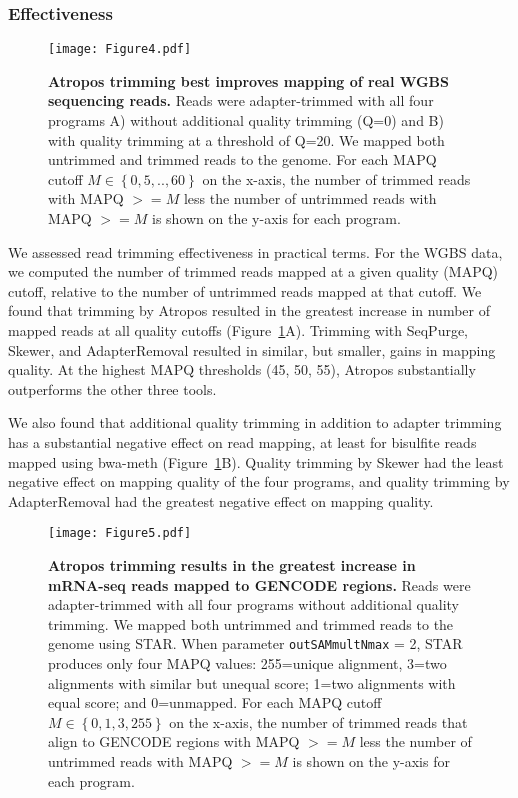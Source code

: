 \documentclass[fleqn,10pt,lineno]{wlpeerj} %
\begin{document}
\subsubsection{Effectiveness}

\begin{figure}[!ht]
\centering
\texttt{[image: Figure4.pdf]}
\caption{\textbf{Atropos trimming best improves mapping of real WGBS sequencing reads.} Reads were adapter-trimmed with all four programs A) without additional quality trimming (Q=0) and B) with quality trimming at a threshold of Q=20. We mapped both untrimmed and trimmed reads to the genome. For each MAPQ cutoff $M \in \left\{{0, 5, .., 60}\right\}$ on the x-axis, the number of trimmed reads with MAPQ $>= M$ less the number of untrimmed reads with MAPQ $>= M$ is shown on the y-axis for each program.}
\label{fig:wgbs-effectiveness}
\end{figure}

We assessed read trimming effectiveness in practical terms. For the WGBS data, we computed the number of trimmed reads mapped at a given quality (MAPQ) cutoff, relative to the number of untrimmed reads mapped at that cutoff. We found that trimming by Atropos resulted in the greatest increase in number of mapped reads at all quality cutoffs (Figure~\ref{fig:wgbs-effectiveness}A). Trimming with SeqPurge, Skewer, and AdapterRemoval resulted in similar, but smaller, gains in mapping quality. At the highest MAPQ thresholds (45, 50, 55), Atropos substantially outperforms the other three tools.

We also found that additional quality trimming in addition to adapter trimming has a substantial negative effect on read mapping, at least for bisulfite reads mapped using bwa-meth (Figure~\ref{fig:wgbs-effectiveness}B). Quality trimming by Skewer had the least negative effect on mapping quality of the four programs, and quality trimming by AdapterRemoval had the greatest negative effect on mapping quality.

\begin{figure}[!ht]
\centering
\texttt{[image: Figure5.pdf]}
\caption{\textbf{Atropos trimming results in the greatest increase in mRNA-seq reads mapped to GENCODE regions.} Reads were adapter-trimmed with all four programs without additional quality trimming. We mapped both untrimmed and trimmed reads to the genome using STAR. When parameter \texttt{outSAMmultNmax} = 2, STAR produces only four MAPQ values: 255=unique alignment, 3=two alignments with similar but unequal score; 1=two alignments with equal score; and 0=unmapped. For each MAPQ cutoff $M \in \left\{{0, 1, 3, 255}\right\}$ on the x-axis, the number of trimmed reads that align to GENCODE regions with MAPQ $>= M$ less the number of untrimmed reads with MAPQ $>= M$ is shown on the y-axis for each program.}
\label{fig:rnaseq-effectiveness}
\end{figure}
\end{document}
